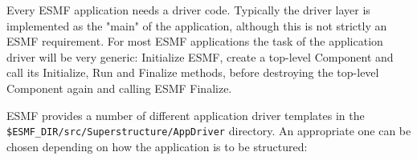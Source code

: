 %


Every ESMF application needs a driver code. Typically the driver layer is
implemented as the "main" of the application, although this is not strictly an
ESMF requirement. For most ESMF applications the task of the application driver
will be very generic: Initialize ESMF, create a top-level Component and call its
Initialize, Run and Finalize methods, before destroying the top-level Component
again and calling ESMF Finalize.

\begin{sloppypar}
ESMF provides a number of different application driver templates in the
{\tt \$ESMF\_DIR/src/Superstructure/AppDriver} directory. An appropriate one 
can be chosen depending on how the application is to be structured:
\end{sloppypar}

